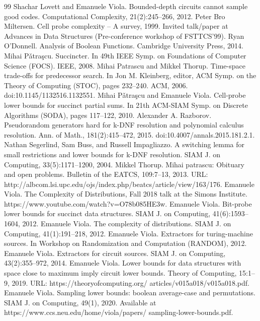 \begin{thebibliography}{99}
 Shachar Lovett and Emanuele Viola. Bounded-depth circuits cannot sample good codes. Computational Complexity, 21(2):245–266, 2012.
 Peter Bro Miltersen. Cell probe complexity – A survey, 1999. Invited talk/paper at Advances in Data Structures (Pre-conference workshop of FSTTCS’99).
 Ryan O’Donnell. Analysis of Boolean Functions. Cambridge University Press, 2014.
 Mihai Pǎtraşcu. Succincter. In 49th IEEE Symp. on Foundations of Computer Science (FOCS). IEEE, 2008.
 Mihai Patrascu and Mikkel Thorup. Time-space trade-offs for predecessor search. In Jon M. Kleinberg, editor, ACM Symp. on the Theory of Computing (STOC), pages 232–240. ACM, 2006. doi:10.1145/1132516.1132551.
 Mihai Pǎtraşcu and Emanuele Viola. Cell-probe lower bounds for succinct partial sums. In 21th ACM-SIAM Symp. on Discrete Algorithms (SODA), pages 117–122, 2010.
 Alexander A. Razborov. Pseudorandom generators hard for k-DNF resolution and polynomial calculus resolution. Ann. of Math., 181(2):415–472, 2015. doi:10.4007/annals.2015.181.2.1.
 Nathan Segerlind, Sam Buss, and Russell Impagliazzo. A switching lemma for small restrictions and lower bounds for k-DNF resolution. SIAM J. on Computing, 33(5):1171–1200, 2004.
 Mikkel Thorup. Mihai patrascu: Obituary and open problems. Bulletin of the EATCS, 109:7–13, 2013. URL: http://albcom.lsi.upc.edu/ojs/index.php/beatcs/article/view/163/176.
 Emanuele Viola. The Complexity of Distributions, Fall 2018 talk at the Simons Institute. https://www.youtube.com/watch?v=O78b085HE3w.
 Emanuele Viola. Bit-probe lower bounds for succinct data structures. SIAM J. on Computing, 41(6):1593–1604, 2012.
 Emanuele Viola. The complexity of distributions. SIAM J. on Computing, 41(1):191–218, 2012.
 Emanuele Viola. Extractors for turing-machine sources. In Workshop on Randomization and Computation (RANDOM), 2012.
 Emanuele Viola. Extractors for circuit sources. SIAM J. on Computing, 43(2):355–972, 2014.
 Emanuele Viola. Lower bounds for data structures with space close to maximum imply circuit lower bounds. Theory of Computing, 15:1–9, 2019. URL: https://theoryofcomputing.org/ articles/v015a018/v015a018.pdf.
 Emanuele Viola. Sampling lower bounds: boolean average-case and permutations. SIAM J. on Computing, 49(1), 2020. Available at https://www.ccs.neu.edu/home/viola/papers/ sampling-lower-bounds.pdf.

\end{thebibliography}
